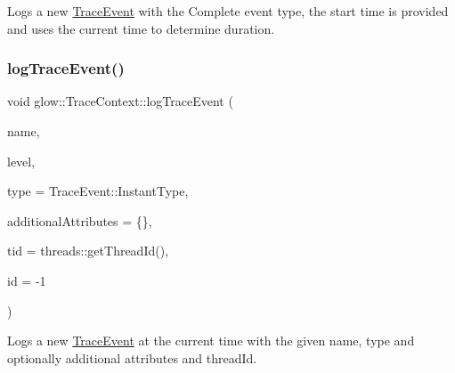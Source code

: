 Logs a new \hyperlink{structglow_1_1_trace_event}{Trace\+Event} with the Complete event type, the start time is provided and uses the current time to determine duration. \mbox{\label{classglow_1_1_trace_context_ac3d59447d63663657a5c31f46d817d06}} 
\subsubsection{\texorpdfstring{log\+Trace\+Event()}{logTraceEvent()}\hspace{0.1cm}{\footnotesize\ttfamily [1/2]}}
{\footnotesize\ttfamily void glow\+::\+Trace\+Context\+::log\+Trace\+Event (\begin{DoxyParamCaption}\item[{llvm\+::\+String\+Ref}]{name,  }\item[{\hyperlink{structglow_1_1_trace_event_a10132a384d74408a112510cbe1b7d978}{Trace\+Level}}]{level,  }\item[{char}]{type = {\ttfamily TraceEvent\+:\+:InstantType},  }\item[{std\+::map$<$ std\+::string, std\+::string $>$}]{additional\+Attributes = {\ttfamily \{\}},  }\item[{size\+\_\+t}]{tid = {\ttfamily threads\+:\+:getThreadId()},  }\item[{int}]{id = {\ttfamily -\/1} }\end{DoxyParamCaption})}

Logs a new \hyperlink{structglow_1_1_trace_event}{Trace\+Event} at the current time with the given {\ttfamily name}, {\ttfamily type} and optionally additional attributes and thread\+Id. \mbox{\label{classglow_1_1_trace_context_aa08041f9fb3daf7e095b1806af87d779}} 
